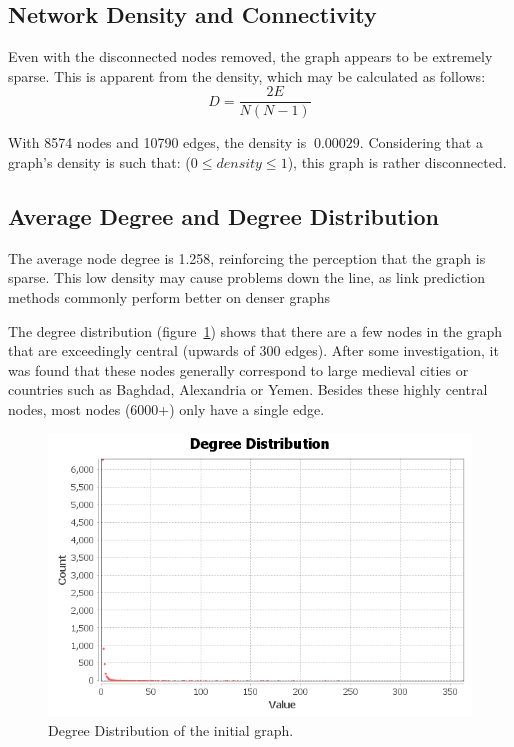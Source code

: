 \subsection{Network Density and Connectivity}\label{subsec:network-density-and-connectivity}
Even with the disconnected nodes removed, the graph appears to be extremely sparse.
This is apparent from the density, which  may be calculated as follows:
\[
    D = \frac{2E}{N(N - 1)}
\]

With 8574 nodes and 10790 edges, the density is $~0.00029$.
Considering that a graph's density is such that: ($0 \leq density \leq 1$), this graph is rather disconnected.

\subsection{Average Degree and Degree Distribution}\label{subsec:average-degree-and-degree-distribution}
The average node degree is 1.258, reinforcing the perception that the graph is sparse.
This low density may cause problems down the line, as link prediction methods commonly perform better on denser graphs

The degree distribution (figure~\ref{fig:degree-distribution})
shows that there are a few nodes in the graph that are exceedingly central
(upwards of 300 edges).
After some investigation,
it was found that these nodes generally correspond to large medieval cities or countries such as Baghdad,
Alexandria or Yemen.
Besides these highly central nodes, most nodes (6000+) only have a single edge.

\begin{figure}[h] %
    \centering %
    \includegraphics[width=1\linewidth]{figures/degree-distribution/degree-distribution} %
    \caption{Degree Distribution of the initial graph.} %
    \label{fig:degree-distribution} %
\end{figure}


